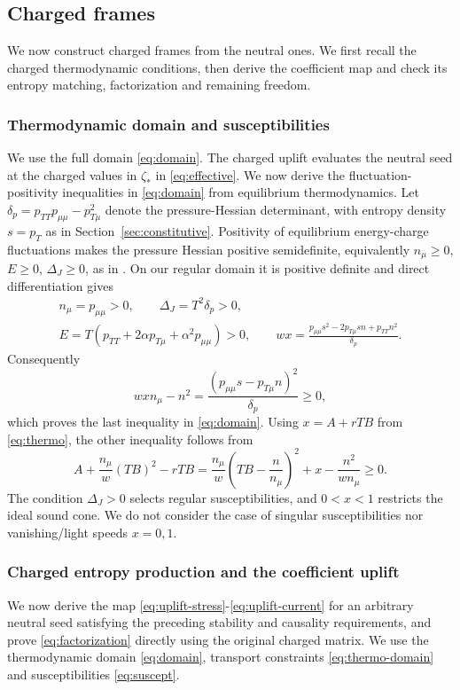 \subsection{Charged frames}\label{app:charged-frames}
We now construct charged frames from the neutral ones. We first recall
the charged thermodynamic conditions, then derive the coefficient map
and check its entropy matching, factorization and remaining freedom.

\subsubsection{Thermodynamic domain and susceptibilities}\label{app:assumptions}
We use the full domain \eqref{eq:domain}. The charged uplift evaluates
the neutral seed at the charged values in $\zeta_*$ in
\eqref{eq:effective}. We now derive the fluctuation-positivity inequalities in
\eqref{eq:domain} from equilibrium thermodynamics.
Let $\delta_p=p_{TT}p_{\mu\mu}-p_{T\mu}^2$ denote the pressure-Hessian
determinant, with entropy density $s=p_T$ as in
Section~\ref{sec:constitutive}. Positivity of equilibrium
energy-charge fluctuations makes the pressure Hessian positive
semidefinite, equivalently $n_\mu\geq0$, $E\geq0$, $\Delta_J\geq0$,
as in \cite{HoultKovtun}. On our regular domain
it is positive definite and direct differentiation gives
\[
 \begin{gathered}
 n_\mu=p_{\mu\mu}>0,\qquad \Delta_J=T^2\delta_p>0,\\
 E=T(p_{TT}+2\alpha p_{T\mu}+\alpha^2p_{\mu\mu})>0,\qquad
 wx=\frac{p_{\mu\mu}s^2-2p_{T\mu}sn+p_{TT}n^2}{\delta_p}.
 \end{gathered}
\]
Consequently
\[
 wx n_\mu-n^2=\frac{(p_{\mu\mu}s-p_{T\mu}n)^2}{\delta_p}\geq0,
\]
which proves the last inequality in \eqref{eq:domain}. Using $x=A+rTB$ from \eqref{eq:thermo}, the other inequality
follows from
\[
 A+\frac{n_\mu}{w}(TB)^2-rTB
 =\frac{n_\mu}{w}\left(TB-\frac{n}{n_\mu}\right)^2
   +x-\frac{n^2}{wn_\mu}\geq0.
\]
The condition $\Delta_J>0$ selects regular susceptibilities, and $0<x<1$
restricts the ideal sound cone. We do not consider the case of singular susceptibilities nor vanishing/light speeds
$x=0,1$.

\subsubsection{Charged entropy production and the coefficient uplift}
\label{app:sec:charged-uplift}
We now derive the map \eqref{eq:uplift-stress}-\eqref{eq:uplift-current} for an
arbitrary neutral seed satisfying the preceding stability and causality requirements, and prove
\eqref{eq:factorization} directly using the original charged matrix. We use the thermodynamic domain
\eqref{eq:domain}, transport constraints \eqref{eq:thermo-domain} and
susceptibilities \eqref{eq:suscept}.


